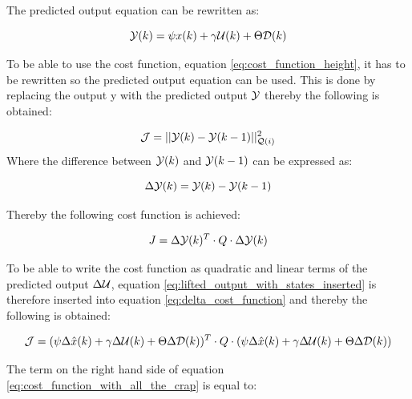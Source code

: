 The predicted output equation can be rewritten as: 

\begin{equation}\label{eq:lifted_output_with_states_inserted}
	\CMcal{Y}(k) = \psi x(k) + \gamma \CMcal{U}(k) + \Theta \CMcal{D}(k)
\end{equation}

To be able to use the cost function, equation \ref{eq:cost_function_height}, it has to be rewritten so the predicted output equation can be used. This is done by replacing the output y with the predicted output $\CMcal{Y}$ thereby the following is obtained:

\begin{equation}
	\CMcal{J} = ||\CMcal{Y}(k)-\CMcal{Y}(k-1)||_{\CMcal{Q}(i)}^2
\end{equation}
Where the difference between $\CMcal{Y}(k)$ and $\CMcal{Y}(k-1)$ can be expressed as:

\begin{equation}
	\Delta \CMcal{Y}(k) =\CMcal{Y}(k)-\CMcal{Y}(k-1) 
\end{equation}

Thereby the following cost function is achieved:

\begin{equation}\label{eq:delta_cost_function}
	J = \Delta\CMcal{Y}(k)^T \cdot Q \cdot \Delta\CMcal{Y}(k)
\end{equation}

To be able to write the cost function as quadratic and linear terms of the predicted output $\Delta\CMcal{U}$, equation \ref{eq:lifted_output_with_states_inserted} is therefore inserted into equation \ref{eq:delta_cost_function} and thereby the following is obtained:

\begin{equation}\label{eq:cost_function_with_all_the_crap}
	\CMcal{J} = (\psi\Delta \hat{x}(k) + \gamma\Delta \CMcal{U}(k) + \Theta\Delta \CMcal{D}(k))^T\cdot Q \cdot (\psi\Delta \hat{x}(k) + \gamma\Delta \CMcal{U}(k) + \Theta\Delta \CMcal{D}(k))
\end{equation}

The term on the right hand side of equation \ref{eq:cost_function_with_all_the_crap} is equal to:


